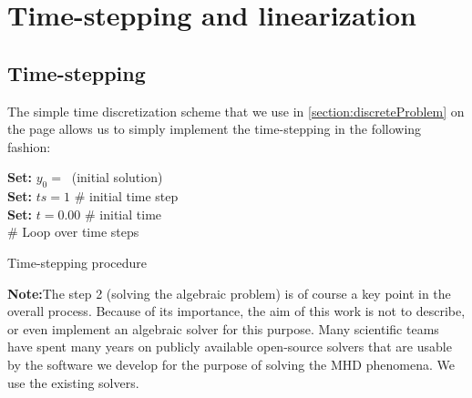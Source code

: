 \section{Time-stepping and linearization}

\subsection{Time-stepping}
The simple time discretization scheme that we use in \ref{section:discreteProblem} on the page \pageref{section:discreteProblem} allows us to simply implement the time-stepping in the following fashion:\\
\begin{algorithm}[H]
\textbf{    Set: }$y_0 =\ $ (initial solution)\\
\textbf{    Set: }$ts =1 $ \# initial time step\\
\textbf{    Set: }$t = 0.00 $ \# initial time\\
    \# Loop over time steps\\

    \caption{Time-stepping procedure}
\end{algorithm}
\textbf{Note:}The step 2 (solving the algebraic problem) is of course a key point in the overall process. Because of its importance, the aim of this work is not to describe, or even implement an algebraic solver for this purpose. Many scientific teams have spent many years on publicly available open-source solvers that are usable by the software we develop for the purpose of solving the MHD phenomena. We use the existing solvers.